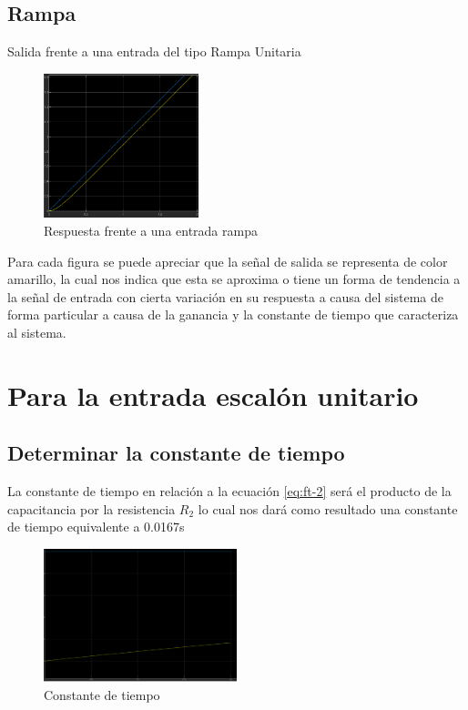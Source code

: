 \documentclass[conference]{IEEEtran}
\begin{document}
	\subsection{Rampa}
	Salida frente a una entrada del tipo Rampa Unitaria
	\begin{figure}[h]
		\centering
		\includegraphics[width=0.4\textwidth]{media/rampa}
		\caption{Respuesta frente a una entrada rampa}
		\label{fig:rampa}
	\end{figure}
	
	Para cada figura se puede apreciar que la señal de salida se representa de color amarillo, la cual nos indica que esta se aproxima o tiene un forma de tendencia a la señal de entrada con cierta variación en su respuesta a causa del sistema de forma particular a causa de la ganancia y la constante de tiempo que caracteriza al sistema.
	
	\section{Para la entrada escalón unitario}
	\subsection{Determinar la constante de tiempo}
	La constante de tiempo en relación a la ecuación \ref{eq:ft-2} será el producto de la capacitancia por la resistencia $R_2$ lo cual nos dará como resultado una constante de tiempo equivalente a 0.0167s
	
	\begin{figure}[h]
		\centering
		\includegraphics[width=0.5\textwidth]{media/tau-escalon}
		\caption{Constante de tiempo}
		\label{fig:tau-escalon}
	\end{figure}
	
\end{document}
